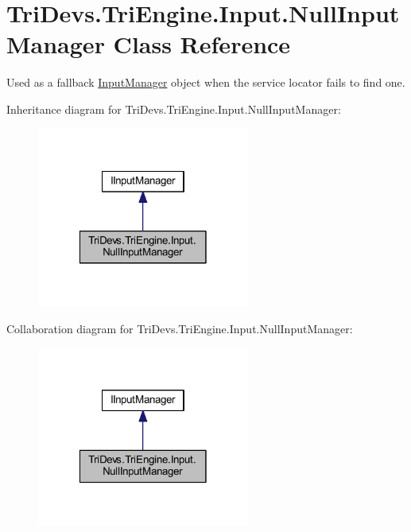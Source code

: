 \hypertarget{class_tri_devs_1_1_tri_engine_1_1_input_1_1_null_input_manager}{\section{Tri\-Devs.\-Tri\-Engine.\-Input.\-Null\-Input\-Manager Class Reference}
\label{class_tri_devs_1_1_tri_engine_1_1_input_1_1_null_input_manager}
}


Used as a fallback \hyperlink{class_tri_devs_1_1_tri_engine_1_1_input_1_1_input_manager}{Input\-Manager} object when the service locator fails to find one.  




Inheritance diagram for Tri\-Devs.\-Tri\-Engine.\-Input.\-Null\-Input\-Manager\-:
\nopagebreak
\begin{figure}[H]
\begin{center}
\leavevmode
\includegraphics[width=198pt]{class_tri_devs_1_1_tri_engine_1_1_input_1_1_null_input_manager__inherit__graph}
\end{center}
\end{figure}


Collaboration diagram for Tri\-Devs.\-Tri\-Engine.\-Input.\-Null\-Input\-Manager\-:
\nopagebreak
\begin{figure}[H]
\begin{center}
\leavevmode
\includegraphics[width=198pt]{class_tri_devs_1_1_tri_engine_1_1_input_1_1_null_input_manager__coll__graph}
\end{center}
\end{figure}
